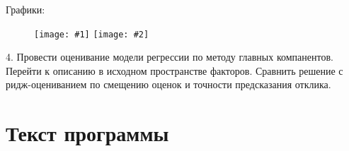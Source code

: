 ﻿\documentclass[12pt, a4paper]{article}
\newcommand{\inputTwoImages}[2]{
\begin{figure}[htbp!]
    \noindent
        \texttt{[image: \#1]}
        \texttt{[image: \#2]}
\end{figure}
}
\newcommand{\myCodeInput}[3]{
{\bf Файл #2}

}
\begin{document}
Графики:

\inputTwoImages{../pics/RSS_from_lambda.png}{../pics/theta_from_lambda.png}



4. Провести оценивание модели регрессии по методу главных компанентов. Перейти к описанию
в исходном пространстве факторов. Сравнить решение с ридж-оцениванием по смещению оценок 
и точности предсказания отклика.

\section{Текст программы}

%
%
\end{document}
